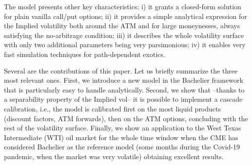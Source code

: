 \documentclass[12pt]{article}
\theoremstyle{definition}
\theoremstyle{remark}
\numberwithin{theorem}{section}
\numberwithin{proposition}{section}
\numberwithin{lemma}{section}
\numberwithin{corollary}{section}
\numberwithin{definition}{section}
\numberwithin{remark}{section}
\numberwithin{example}{section}
\begin{document}
The model presents other key characteristics: i) it grants a closed-form solution for plain vanilla
call/put options; ii) it provides a simple analytical expression for the Implied volatility both around
the ATM and for large moneynesses, always satisfying the no-arbitrage condition; iii) it describes the whole volatility surface with only two additional parameters being very parsimonious; iv) it enables very fast simulation techniques for path-dependent exotics. 
 

\smallskip

Several are the contributions of this paper. Let us briefly summarize the three most relevant ones.
First, we introduce a new model in the Bachelier framework that is particularly easy to handle analytically. 
Second, we show that --thanks to a separability property of the Implied vol-- it is possible to implement a cascade calibration, i.e., the model is calibrated
first on the most liquid products (discount factors, ATM forwards), 
then on the ATM options, concluding with the rest of the volatility surface.
Finally, we show an application to the West Texas Intermediate (WTI) oil market for the whole time window 
when the CME has considered Bachelier as the reference model (some months during the Covid-19 pandemic, when the market
was very volatile) obtaining excellent results.
\end{document}
